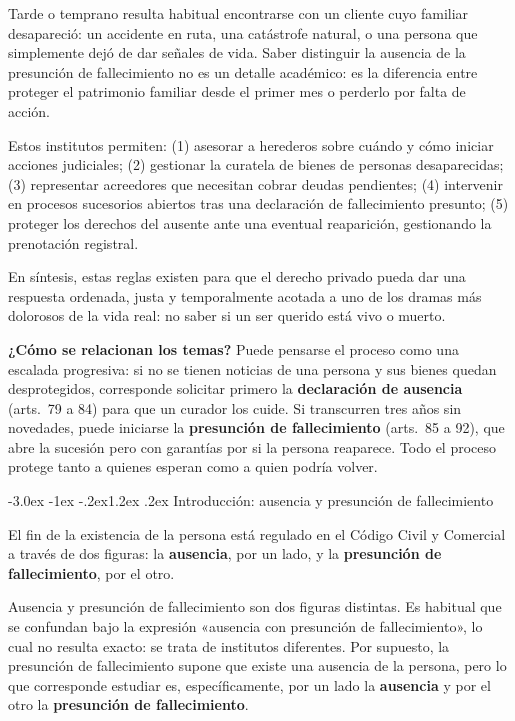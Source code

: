 \documentclass[12pt,oneside]{book}
\makeatletter
\renewcommand\section{\@startsection{section}{1}{\z@}%
  {-3.0ex \@plus -1ex \@minus -.2ex}{1.2ex \@plus .2ex}%
  {\normalfont\large\bfseries\color{acento}}}
\makeatother
\begin{document}
\begin{nota}
Tarde o temprano resulta habitual encontrarse con un cliente cuyo familiar desapareció: un accidente en ruta, una catástrofe natural, o una persona que simplemente dejó de dar señales de vida. Saber distinguir la ausencia de la presunción de fallecimiento no es un detalle académico: es la diferencia entre proteger el patrimonio familiar desde el primer mes o perderlo por falta de acción.

Estos institutos permiten: (1) asesorar a herederos sobre cuándo y cómo iniciar acciones judiciales; (2) gestionar la curatela de bienes de personas desaparecidas; (3) representar acreedores que necesitan cobrar deudas pendientes; (4) intervenir en procesos sucesorios abiertos tras una declaración de fallecimiento presunto; (5) proteger los derechos del ausente ante una eventual reaparición, gestionando la prenotación registral.

En síntesis, estas reglas existen para que el derecho privado pueda dar una respuesta ordenada, justa y temporalmente acotada a uno de los dramas más dolorosos de la vida real: no saber si un ser querido está vivo o muerto.
\end{nota}

\textbf{¿Cómo se relacionan los temas?} Puede pensarse el proceso como una escalada progresiva: si no se tienen noticias de una persona y sus bienes quedan desprotegidos, corresponde solicitar primero la \textbf{declaración de ausencia} (arts.~79 a 84) para que un curador los cuide. Si transcurren tres años sin novedades, puede iniciarse la \textbf{presunción de fallecimiento} (arts.~85 a 92), que abre la sucesión pero con garantías por si la persona reaparece. Todo el proceso protege tanto a quienes esperan como a quien podría volver.

\section{Introducción: ausencia y presunción de fallecimiento}

El fin de la existencia de la persona está regulado en el Código Civil y
Comercial a través de dos figuras: la \textbf{ausencia}, por un lado, y la
\textbf{presunción de fallecimiento}, por el otro.

Ausencia y presunción de fallecimiento son dos figuras distintas. Es
habitual que se confundan bajo la expresión «ausencia con presunción de
fallecimiento», lo cual no resulta exacto: se trata de institutos
diferentes. Por supuesto, la presunción de fallecimiento supone que existe
una ausencia de la persona, pero lo que corresponde estudiar es,
específicamente, por un lado la \textbf{ausencia} y por el otro la
\textbf{presunción de fallecimiento}.
\end{document}
